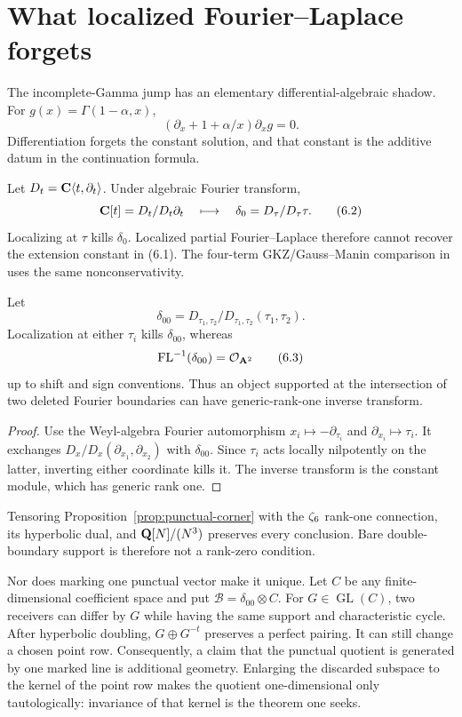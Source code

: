 \section{What localized Fourier--Laplace forgets}
\label{sec:fourier-boundary}

The incomplete-Gamma jump has an elementary differential-algebraic shadow.
For \(g(x)=\Gamma(1-\alpha,x)\),
\[
 (\partial_x+1+\alpha/x)\partial_xg=0.                         \tag{6.1}
\]
Differentiation forgets the constant solution, and that constant is the
additive datum in the continuation formula.

Let \(D_t=\mathbf C\langle t,\partial_t\rangle\).  Under algebraic Fourier transform,
\[
 \mathbf C[t]=D_t/D_t\partial_t
 \quad\longmapsto\quad
 \delta_0=D_\tau/D_\tau\tau.                                \tag{6.2}
\]
Localizing at \(\tau\) kills \(\delta_0\).  Localized partial
Fourier--Laplace therefore cannot recover the extension constant in (6.1).
The four-term GKZ/Gauss--Manin comparison in \cite{RSSW} uses the same
nonconservativity.

\begin{proposition}
\label{prop:punctual-corner}
Let
\[
 \delta_{00}=
 D_{\tau_1,\tau_2}/D_{\tau_1,\tau_2}(\tau_1,\tau_2).
\]
Localization at either \(\tau_i\) kills \(\delta_{00}\), whereas
\[
 \operatorname{FL}^{-1}(\delta_{00})=\mathcal O_{\mathbf A^2}                            \tag{6.3}
\]
up to shift and sign conventions.  Thus an object supported at the
intersection of two deleted Fourier boundaries can have generic-rank-one
inverse transform.
\end{proposition}

\begin{proof}
Use the Weyl-algebra Fourier automorphism
\(x_i\mapsto-\partial_{\tau_i}\) and
\(\partial_{x_i}\mapsto\tau_i\).  It exchanges
\(D_x/D_x(\partial_{x_1},\partial_{x_2})\) with \(\delta_{00}\).
Since \(\tau_i\) acts locally nilpotently on the latter, inverting either
coordinate
kills it.  The inverse transform is the constant module, which has generic
rank one.
\end{proof}

Tensoring Proposition~\ref{prop:punctual-corner} with the
\(\zeta_{6}\) rank-one connection, its hyperbolic dual, and
\(\mathbf Q[N]/(N^3)\) preserves every conclusion.  Bare double-boundary support is
therefore not a rank-zero condition.

Nor does marking one punctual vector make it unique.  Let \(C\) be any
finite-dimensional coefficient space and put
\(\mathcal B=\delta_{00}\otimes C\).  For
\(G\in\operatorname{GL}(C)\), two receivers can differ by \(G\) while
having the same support and characteristic cycle.  After hyperbolic doubling,
\(G\oplus G^{-t}\) preserves a perfect pairing.  It can still change a chosen
point row.  Consequently, a claim that the punctual quotient is generated by
one marked line is additional geometry.  Enlarging the discarded subspace to
the kernel of the point row makes the quotient one-dimensional only
tautologically: invariance of that kernel is the theorem one seeks.

